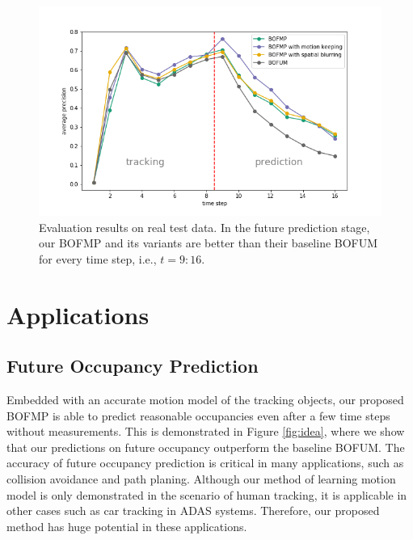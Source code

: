 \begin{figure}[ht]
  \centering
   \captionsetup{width=\linewidth}
    \includegraphics[width=.8\textwidth]{figures/test_on_real_data.png}
    \caption{Evaluation results on real test data. In the future prediction stage, our BOFMP and its variants are better than their baseline BOFUM for every time step, i.e., $t=9:16$.}
    \label{fig:real_test_data}
\end{figure}

\section{Applications}

\subsection{Future Occupancy Prediction}

Embedded with an accurate motion model of the tracking objects, our proposed BOFMP is able to predict reasonable occupancies even after a few time steps without measurements. This is demonstrated in Figure \ref{fig:idea}, where we show that our predictions on future occupancy outperform the baseline BOFUM. The accuracy of future occupancy prediction is critical in many applications, such as collision avoidance and path planing. Although our method of learning motion model is only demonstrated in the scenario of human tracking, it is applicable in other cases such as car tracking in ADAS systems. Therefore, our proposed method has huge potential in these applications. 

